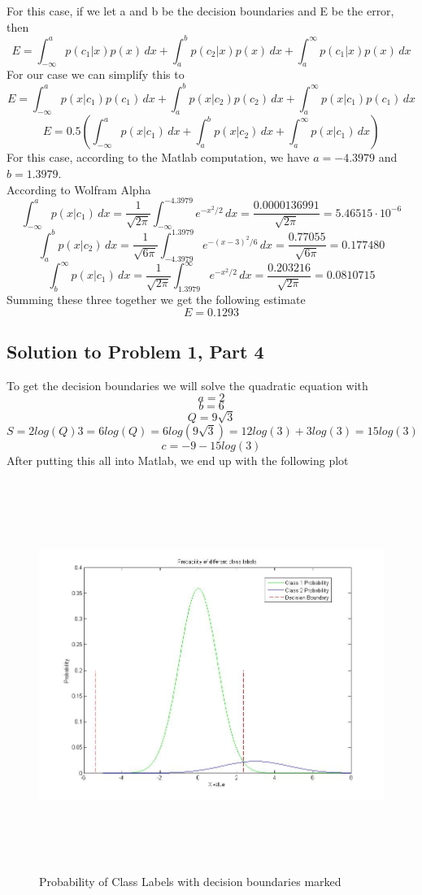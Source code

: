 \documentclass[11pt,psfig]{article}
\begin{document}
For this case, if we let a and b be the decision boundaries and E be the error, then
\[
E = \int_{-\infty}^{a}{p(c_1|x)p(x) \, dx} + \int_{a}^{b}{p(c_2|x)p(x) \, dx} + \int_{a}^{\infty}{p(c_1|x)p(x) \, dx}
\]
For our case we can simplify this to
\[
E = \int_{-\infty}^{a}{p(x|c_1)p(c_1) \, dx} + \int_{a}^{b}{p(x|c_2)p(c_2) \, dx} + \int_{a}^{\infty}{p(x|c_1)p(c_1) \, dx}
\]
\[
E = 0.5(\int_{-\infty}^{a}{p(x|c_1) \, dx} + \int_{a}^{b}{p(x|c_2) \, dx} + \int_{a}^{\infty}{p(x|c_1) \, dx})
\]
For this case, according to the Matlab computation, we have $a=-4.3979$ and $b=1.3979$. \\
According to Wolfram Alpha
\[
\int_{-\infty}^{a}{p(x|c_1) \, dx} = \frac{1}{\sqrt{2\pi}} \int_{-\infty}^{-4.3979}{e^{-x^2/2} \, dx} = \frac{0.0000136991}{\sqrt{2\pi}} = 5.46515 \cdot 10^{-6}
\]
\[
\int_{a}^{b}{p(x|c_2) \, dx} = \frac{1}{\sqrt{6\pi}} \int_{-4.3979}^{1.3979}{e^{-(x-3)^2/6} \, dx} = \frac{0.77055}{\sqrt{6\pi}} = 0.177480
\]
\[
\int_{b}^{\infty}{p(x|c_1) \, dx} = \frac{1}{\sqrt{2\pi}} \int_{1.3979}^{\infty}{e^{-x^2/2} \, dx} = \frac{0.203216}{\sqrt{2\pi}} = 0.0810715
\]
Summing these three together we get the following estimate
\[
E = 0.1293
\]

\subsection*{Solution to Problem 1, Part 4}

To get the decision boundaries we will solve the quadratic equation with
\[
a = 2
\]
\[
b = 6
\]
\[
Q = 9 \sqrt{3}
\]
\[
S = 2 log(Q) 3 = 6 log(Q) = 6log( 9 \sqrt{3}) = 12 log(3) + 3 log(3) = 15 log(3)
\]
\[
c = -9 - 15 log(3)
\]
After putting this all into Matlab, we end up with the following plot
\begin{figure}[H]
\centering
\includegraphics[height=5in]{prob1part2plot.jpg}
\caption{Probability of Class Labels with decision boundaries marked}
\end{figure}
\end{document}
